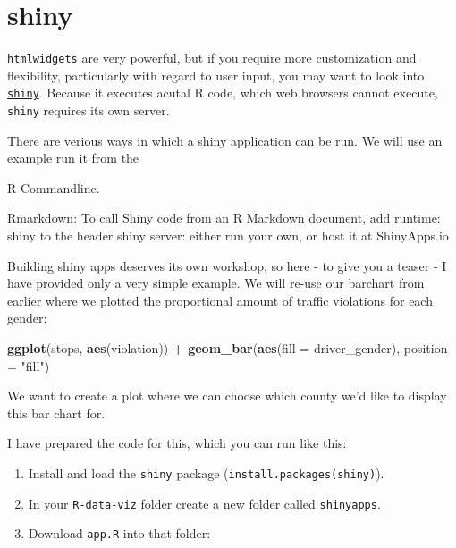 \documentclass[]{book}
\newenvironment{Shaded}{\begin{snugshade}}{\end{snugshade}}
\newcommand{\KeywordTok}[1]{\textcolor[rgb]{0.13,0.29,0.53}{\textbf{#1}}}
\newcommand{\DataTypeTok}[1]{\textcolor[rgb]{0.13,0.29,0.53}{#1}}
\newcommand{\StringTok}[1]{\textcolor[rgb]{0.31,0.60,0.02}{#1}}
\newcommand{\OperatorTok}[1]{\textcolor[rgb]{0.81,0.36,0.00}{\textbf{#1}}}
\newcommand{\NormalTok}[1]{#1}
\theoremstyle{definition}
\theoremstyle{definition}
\theoremstyle{definition}
\theoremstyle{remark}
\begin{document}
\section{shiny}\label{shiny}

\texttt{htmlwidgets} are very powerful, but if you require more
customization and flexibility, particularly with regard to user input,
you may want to look into
\href{https://CRAN.R-project.org/package=shiny}{\texttt{shiny}}. Because
it executes acutal R code, which web browsers cannot execute,
\texttt{shiny} requires its own server.

There are verious ways in which a shiny application can be run. We will
use an example run it from the

R Commandline.

Rmarkdown: To call Shiny code from an R Markdown document, add runtime:
shiny to the header shiny server: either run your own, or host it at
ShinyApps.io

Building shiny apps deserves its own workshop, so here - to give you a
teaser - I have provided only a very simple example. We will re-use our
barchart from earlier where we plotted the proportional amount of
traffic violations for each gender:

\begin{Shaded}
\begin{Highlighting}[]
\KeywordTok{ggplot}\NormalTok{(stops, }\KeywordTok{aes}\NormalTok{(violation)) }\OperatorTok{+}\StringTok{ }
\StringTok{        }\KeywordTok{geom_bar}\NormalTok{(}\KeywordTok{aes}\NormalTok{(}\DataTypeTok{fill =}\NormalTok{ driver_gender), }\DataTypeTok{position =} \StringTok{"fill"}\NormalTok{)}
\end{Highlighting}
\end{Shaded}

We want to create a plot where we can choose which county we'd like to
display this bar chart for.

I have prepared the code for this, which you can run like this:

\begin{enumerate}
\def\labelenumi{\arabic{enumi}.}
\item
  Install and load the \texttt{shiny} package
  (\texttt{install.packages(shiny)}).
\item
  In your \texttt{R-data-viz} folder create a new folder called
  \texttt{shinyapps}.
\item
  Download \texttt{app.R} into that folder:
\end{enumerate}
\end{document}

